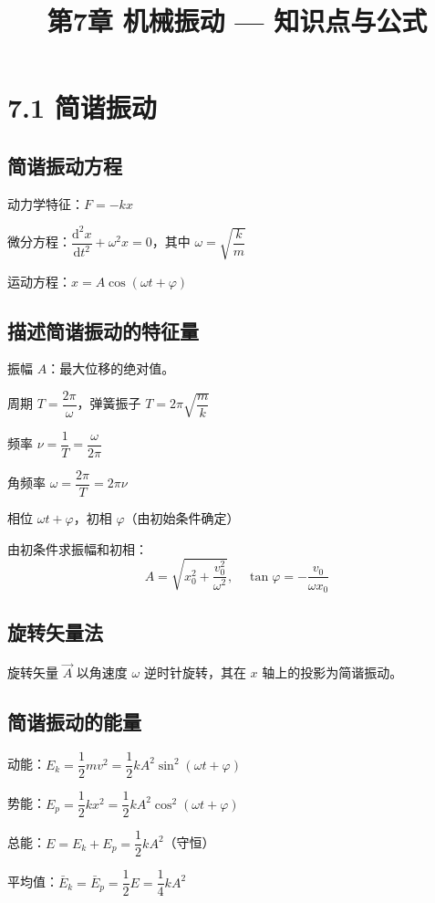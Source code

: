 \documentclass{ctexart}
\title{\textbf{第7章 机械振动} --- 知识点与公式}
\author{}
\date{}
\begin{document}
\maketitle

\section*{7.1 简谐振动}

\subsection*{简谐振动方程}
动力学特征：$F = -kx$

微分方程：$\dfrac{\mathrm{d}^{2}x}{\mathrm{d}t^{2}} + \omega^{2}x = 0$，其中 $\omega = \sqrt{\dfrac{k}{m}}$

运动方程：$x = A\cos(\omega t + \varphi)$

\subsection*{描述简谐振动的特征量}
振幅 $A$：最大位移的绝对值。

周期 $T = \dfrac{2\pi}{\omega}$，弹簧振子 $T = 2\pi\sqrt{\dfrac{m}{k}}$

频率 $\nu = \dfrac{1}{T} = \dfrac{\omega}{2\pi}$

角频率 $\omega = \dfrac{2\pi}{T} = 2\pi\nu$

相位 $\omega t + \varphi$，初相 $\varphi$（由初始条件确定）

由初条件求振幅和初相：
\[
A = \sqrt{x_0^{2} + \frac{v_0^{2}}{\omega^{2}}},\quad
\tan\varphi = -\frac{v_0}{\omega x_0}
\]

\subsection*{旋转矢量法}
旋转矢量 $\vec{A}$ 以角速度 $\omega$ 逆时针旋转，其在 $x$ 轴上的投影为简谐振动。

\subsection*{简谐振动的能量}
动能：$E_k = \dfrac12 mv^{2} = \dfrac12 kA^{2}\sin^{2}(\omega t + \varphi)$

势能：$E_p = \dfrac12 kx^{2} = \dfrac12 kA^{2}\cos^{2}(\omega t + \varphi)$

总能：$E = E_k + E_p = \dfrac12 kA^{2}$（守恒）

平均值：$\bar{E}_k = \bar{E}_p = \dfrac12 E = \dfrac14 kA^{2}$
\end{document}
